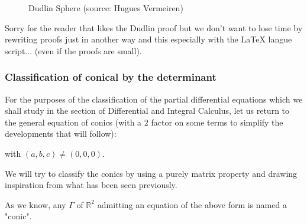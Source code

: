 \begin{figure}[H]
\begin{center}
	\end{center}
		\caption{Dudlin Sphere (source: Hugues Vermeiren)}
	\end{figure}
	Sorry for the reader that likes the Dudlin proof but we don't want to lose time by rewriting proofs just in another way and this especially with the \LaTeX{} langue script... (even if the proofs are small). 
	
	\subsubsection{Classification of conical by the determinant}
	For the purposes of the classification of the partial differential equations which we shall study in the section of Differential and Integral Calculus, let us return to the general equation of conics (with a $2$ factor on some terms to simplify the developments that will follow):
	
	with $(a,b,c)\neq (0,0,0)$. 

	We will try to classify the conics by using a purely matrix property and drawing inspiration from what has been seen previously.

	As we know, any $\Gamma$ of $\mathbb{R}^2$ admitting an equation of the above form is named a "conic".

